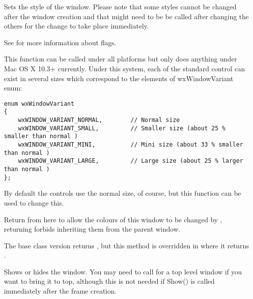 
Sets the style of the window. Please note that some styles cannot be changed
after the window creation and that  might
need to be be called after changing the others for the change to take place
immediately.

See  for more information about flags.




\label{wxwindowsetwindowvariant}


This function can be called under all platforms but only does anything under
Mac OS X 10.3+ currently. Under this system, each of the standard control can
exist in several sizes which correspond to the elements of wxWindowVariant
enum:
\begin{verbatim}
enum wxWindowVariant
{
    wxWINDOW_VARIANT_NORMAL,        // Normal size
    wxWINDOW_VARIANT_SMALL,         // Smaller size (about 25 % smaller than normal )
    wxWINDOW_VARIANT_MINI,          // Mini size (about 33 % smaller than normal )
    wxWINDOW_VARIANT_LARGE,         // Large size (about 25 % larger than normal )
};
\end{verbatim}

By default the controls use the normal size, of course, but this function can
be used to change this.


\label{wxwindowshouldinheritcolours}


Return \true from here to allow the colours of this window to be changed by
, returning \false
forbids inheriting them from the parent window.

The base class version returns \false, but this method is overridden in
 where it returns \true.


\label{wxwindowshow}


Shows or hides the window. You may need to call 
for a top level window if you want to bring it to top, although this is not
needed if Show() is called immediately after the frame creation.


